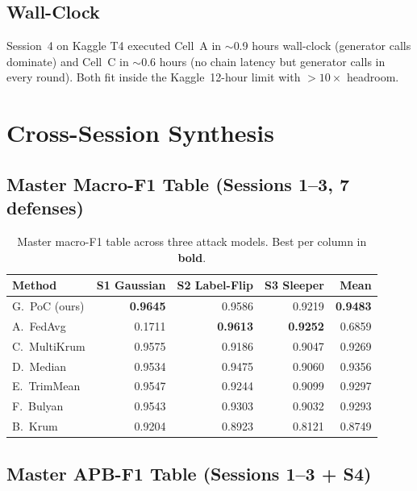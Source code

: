 \documentclass[11pt,a4paper]{article}
\begin{document}
\subsection{Wall-Clock}

Session~4 on Kaggle T4 executed Cell~A in $\sim$0.9 hours wall-clock
(generator calls dominate) and Cell~C in $\sim$0.6 hours (no chain
latency but generator calls in every round). Both fit inside the
Kaggle~12-hour limit with $>10\times$ headroom.

\newpage
\section{Cross-Session Synthesis}
\label{sec:synthesis}

\subsection{Master Macro-F1 Table (Sessions 1--3, 7 defenses)}

\begin{table}[H]
\centering
\caption{Master macro-F1 table across three attack models. Best per column in \textbf{bold}.}
\label{tab:master_macro}
\begin{tabular}{@{}l rrr r@{}}
\toprule
\textbf{Method} & \textbf{S1 Gaussian} & \textbf{S2 Label-Flip} & \textbf{S3 Sleeper} & \textbf{Mean} \\
\midrule
G.\ PoC (ours) & \textbf{0.9645} & 0.9586 & 0.9219 & \textbf{0.9483} \\
A.\ FedAvg     & \cellcolor{softred}0.1711 & \textbf{0.9613} & \textbf{0.9252} & 0.6859 \\
C.\ MultiKrum  & 0.9575 & 0.9186 & 0.9047 & 0.9269 \\
D.\ Median     & 0.9534 & 0.9475 & 0.9060 & 0.9356 \\
E.\ TrimMean   & 0.9547 & 0.9244 & 0.9099 & 0.9297 \\
F.\ Bulyan     & 0.9543 & 0.9303 & 0.9032 & 0.9293 \\
B.\ Krum       & 0.9204 & 0.8923 & \cellcolor{softred}0.8121 & 0.8749 \\
\bottomrule
\end{tabular}
\end{table}

\subsection{Master APB-F1 Table (Sessions 1--3 + S4)}
\end{document}
